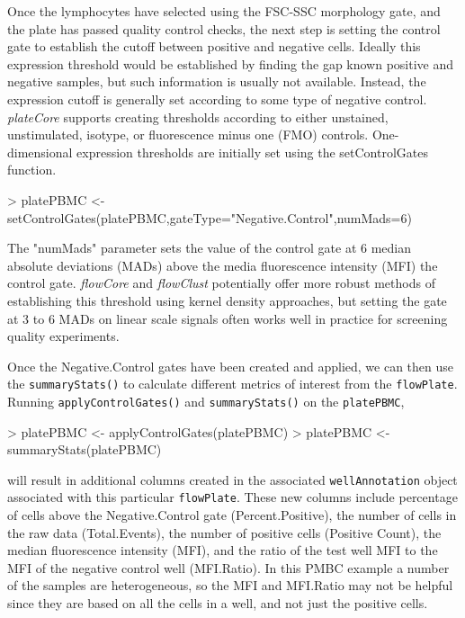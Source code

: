 \documentclass[12pt]{article}
\newcommand{\Rfunction}[1]{{\texttt{#1()}}}
\newcommand{\Rclass}[1]{{\texttt{#1}}}
\newcommand{\Robject}[1]{{\texttt{#1}}}
\newcommand{\Rpackage}[1]{{\textit{#1}}}
\begin{document}
\clearpage
Once the lymphocytes have selected using the FSC-SSC morphology gate, and the plate has passed quality control
checks, the next step is setting the control gate to establish the cutoff between positive and negative cells.
Ideally this expression threshold would be established by finding the gap known positive and negative samples, but such information is
usually not available. Instead, the expression cutoff is generally set according to some type of negative control. 
\Rpackage{plateCore} supports creating thresholds according to either unstained, unstimulated, isotype, 
or fluorescence minus one (FMO) controls. One-dimensional expression thresholds are initially set using
the setControlGates function. 
\begin{Schunk}
\begin{Sinput}
> platePBMC <- setControlGates(platePBMC,gateType="Negative.Control",numMads=6)
\end{Sinput}
\end{Schunk}
The "numMads" parameter sets the value of the control gate at 6 median absolute deviations (MADs) above 
the media fluorescence intensity (MFI) the control gate. \Rpackage{flowCore} and \Rpackage{flowClust} potentially offer
more robust methods of establishing this threshold using kernel density approaches, but setting the
gate at 3 to 6 MADs on linear scale signals often works well in practice for screening quality experiments.

Once the Negative.Control gates have been created and applied, we can then use the \Rfunction{summaryStats} to calculate different
metrics of interest from the \Rclass{flowPlate}. Running \Rfunction{applyControlGates} and \Rfunction{summaryStats} on the \Robject{platePBMC}, 
\begin{Schunk}
\begin{Sinput}
> platePBMC <- applyControlGates(platePBMC)
> platePBMC <- summaryStats(platePBMC)
\end{Sinput}
\end{Schunk}
will result in additional columns created in the associated \Robject{wellAnnotation} object associated with this
particular \Robject{flowPlate}.  
These new columns include percentage of cells above the Negative.Control gate (Percent.Positive),
the number of cells in the raw data (Total.Events), the number of positive cells (Positive Count),
the median fluorescence intensity (MFI), and the ratio of the test well MFI to the MFI of the negative
control well (MFI.Ratio). In this PMBC example a number of the samples are heterogeneous, so the MFI and MFI.Ratio
may not be helpful since they are based on all the cells in a well, and not just the positive cells.
\end{document}
